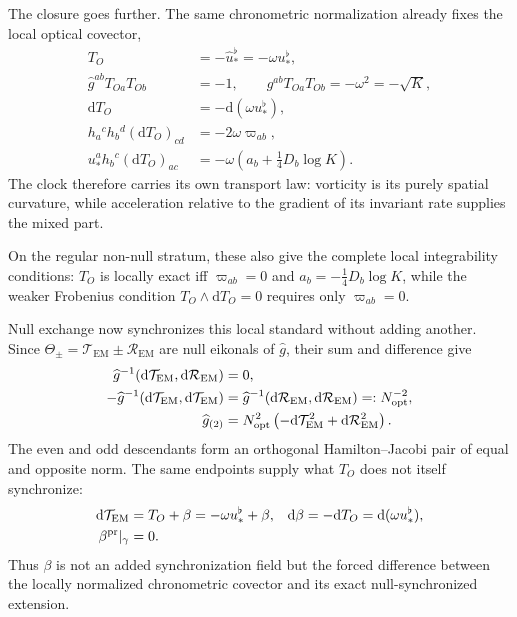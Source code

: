 \documentclass[aps,prl,reprint]{revtex4-2}
\newcommand{\EM}{\mathrm{EM}}
\newcommand{\dd}{\mathrm d}
\begin{document}
The closure goes further. The same chronometric normalization already fixes the local optical covector,
\begin{equation}
\begin{aligned}
T_O&=-\widehat u_*^\flat=-\omega u_*^\flat,\\
\widehat g^{ab}T_{Oa}T_{Ob}
&=-1,\qquad
g^{ab}T_{Oa}T_{Ob}
=-\omega^2=-\sqrt K,\\
\dd T_O&=-\dd(\omega u_*^\flat),\\
h_a{}^ch_b{}^d(\dd T_O)_{cd}&=-2\omega\varpi_{ab},\\
u_*^ah_b{}^c(\dd T_O)_{ac}
&=-\omega\!\left(a_b+\frac14D_b\log K\right).
\end{aligned}
\label{eq:clocktransport}
\end{equation}
The clock therefore carries its own transport law: vorticity is its purely spatial curvature, while acceleration relative to the gradient of its invariant rate supplies the mixed part.

On the regular non-null stratum, these also give the complete local integrability conditions: $T_O$ is locally exact iff
$\varpi_{ab}=0$ and $a_b=-\tfrac14D_b\log K$, while the weaker Frobenius condition
$T_O\wedge\dd T_O=0$ requires only $\varpi_{ab}=0$.

Null exchange now synchronizes this local standard without adding another. Since $\Theta_\pm=\mathcal T_{\EM}\pm\mathcal R_{\EM}$ are null eikonals of $\widehat g$, their sum and difference give
\begin{equation}
\begin{aligned}
\widehat g^{-1}(\dd\mathcal T_{\EM},\dd\mathcal R_{\EM})&=0,\\
-\widehat g^{-1}(\dd\mathcal T_{\EM},\dd\mathcal T_{\EM})
&=\widehat g^{-1}(\dd\mathcal R_{\EM},\dd\mathcal R_{\EM})
=:N_{\rm opt}^{-2},\\
\widehat g_{(2)}
&=N_{\rm opt}^{2}
\left(-\dd\mathcal T_{\EM}^{2}
+\dd\mathcal R_{\EM}^{2}\right).
\end{aligned}
\label{eq:opticalclosure}
\end{equation}
The even and odd descendants form an orthogonal Hamilton--Jacobi pair of equal and opposite norm. The same endpoints supply what $T_O$ does not itself synchronize:
\begin{equation}
\begin{aligned}
\dd\mathcal T_{\EM}
&=T_O+\beta=-\omega u_*^\flat+\beta,
&\dd\beta&=-\dd T_O=\dd(\omega u_*^\flat),\\
\beta^{\rm pr}|_\gamma&=0 .
\end{aligned}
\label{eq:synchronization}
\end{equation}
Thus $\beta$ is not an added synchronization field but the forced difference between the locally normalized chronometric covector and its exact null-synchronized extension.
\end{document}
